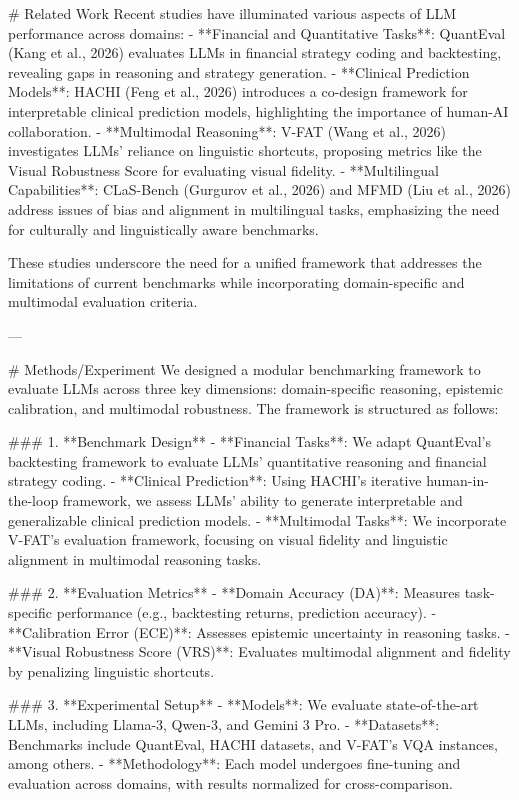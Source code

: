 # Related Work  
Recent studies have illuminated various aspects of LLM performance across domains:
- **Financial and Quantitative Tasks**: QuantEval (Kang et al., 2026) evaluates LLMs in financial strategy coding and backtesting, revealing gaps in reasoning and strategy generation.  
- **Clinical Prediction Models**: HACHI (Feng et al., 2026) introduces a co-design framework for interpretable clinical prediction models, highlighting the importance of human-AI collaboration.  
- **Multimodal Reasoning**: V-FAT (Wang et al., 2026) investigates LLMs’ reliance on linguistic shortcuts, proposing metrics like the Visual Robustness Score for evaluating visual fidelity.  
- **Multilingual Capabilities**: CLaS-Bench (Gurgurov et al., 2026) and MFMD (Liu et al., 2026) address issues of bias and alignment in multilingual tasks, emphasizing the need for culturally and linguistically aware benchmarks.  

These studies underscore the need for a unified framework that addresses the limitations of current benchmarks while incorporating domain-specific and multimodal evaluation criteria.

---

# Methods/Experiment  
We designed a modular benchmarking framework to evaluate LLMs across three key dimensions: domain-specific reasoning, epistemic calibration, and multimodal robustness. The framework is structured as follows:

### 1. **Benchmark Design**
   - **Financial Tasks**: We adapt QuantEval's backtesting framework to evaluate LLMs’ quantitative reasoning and financial strategy coding.  
   - **Clinical Prediction**: Using HACHI's iterative human-in-the-loop framework, we assess LLMs’ ability to generate interpretable and generalizable clinical prediction models.  
   - **Multimodal Tasks**: We incorporate V-FAT’s evaluation framework, focusing on visual fidelity and linguistic alignment in multimodal reasoning tasks.

### 2. **Evaluation Metrics**
   - **Domain Accuracy (DA)**: Measures task-specific performance (e.g., backtesting returns, prediction accuracy).  
   - **Calibration Error (ECE)**: Assesses epistemic uncertainty in reasoning tasks.  
   - **Visual Robustness Score (VRS)**: Evaluates multimodal alignment and fidelity by penalizing linguistic shortcuts.  

### 3. **Experimental Setup**
   - **Models**: We evaluate state-of-the-art LLMs, including Llama-3, Qwen-3, and Gemini 3 Pro.  
   - **Datasets**: Benchmarks include QuantEval, HACHI datasets, and V-FAT’s VQA instances, among others.  
   - **Methodology**: Each model undergoes fine-tuning and evaluation across domains, with results normalized for cross-comparison.

